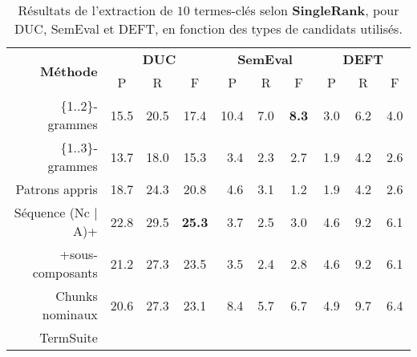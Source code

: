     \begin{table}
      \centering
      \begin{tabular}{@{~~}rc@{~~~}c@{~~~}cc@{~~~}c@{~~~}cc@{~~~}c@{~~~}c@{~~}}
        \toprule
        \multirow{2}{*}[-2pt]{\textbf{Méthode}} & \multicolumn{3}{c}{\textbf{DUC}} & \multicolumn{3}{c}{\textbf{SemEval}} & \multicolumn{3}{c}{\textbf{DEFT}}\\
        \cmidrule(r){2-4}\cmidrule(lr){5-7}\cmidrule(l){8-10}
        & P & R & F & P & R & F & P & R & F\\
        \midrule
        \{1..2\}-grammes & 15.5 & 20.5 & 17.4 & 10.4 & $~~$7.0 & \textbf{$~~$8.3} & $~~$3.0 & $~~$6.2 & $~~$4.0\\
        \{1..3\}-grammes & 13.7 & 18.0 & 15.3 & $~~$3.4 & $~~$2.3 & $~~$2.7 & $~~$1.9 & $~~$4.2 & $~~$2.6\\
        Patrons appris & 18.7 & 24.3 & 20.8 & $~~$4.6 & $~~$3.1 & $~~$1.2 & $~~$1.9 & $~~$4.2 & $~~$2.6\\
        Séquence (Nc | A)+ & 22.8 & 29.5 & \textbf{25.3} & $~~$3.7 & $~~$2.5 & $~~$3.0 & $~~$4.6 & $~~$9.2 & $~~$6.1\\
        +sous-composants & 21.2 & 27.3 & 23.5 & $~~$3.5 & $~~$2.4 & $~~$2.8 & $~~$4.6 & $~~$9.2 & $~~$6.1\\
        Chunks nominaux & 20.6 & 27.3 & 23.1 & $~~$8.4 & $~~$5.7 & $~~$6.7 & $~~$4.9 & $~~$9.7 & $~~$6.4\\
        TermSuite & & & & & & & & & \\
        \bottomrule
      \end{tabular}
      \caption{Résultats de l'extraction de $10$ termes-clés selon
               \textbf{SingleRank}, pour DUC, SemEval et DEFT, en fonction des
               types de candidats utilisés. 
               \label{tab:resultats_de_singlerank}}
    \end{table}
